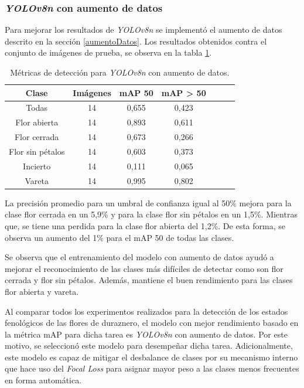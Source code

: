 \subsubsection{\textit{YOLOv8n} con aumento de datos}
\label{YOLOv8n con aumento de dato}

Para mejorar los resultados de \textit{YOLOv8n} se implementó el aumento de datos descrito en la sección \ref{aumentoDatos}. Los resultados obtenidos contra el conjunto de imágenes de prueba, se observa en la tabla \ref{tab:resultadosYoloConAug}.

\begin{table}[h]
	\centering
	\caption{Métricas de detección para \textit{YOLOv8n} con aumento de datos.}
	\begin{tabular}{c c c c c c c}    
		\toprule
		\textbf{Clase}&\textbf{Imágenes}&\textbf{mAP 50}&\textbf{mAP > 50}\\
		\midrule
		Todas & 14 & 0,655 & 0,423\\
		Flor abierta & 14 & 0,893 & 0,611 \\
		Flor cerrada & 14 & 0,673 & 0,266 \\
		Flor sin pétalos & 14 & 0,603 & 0,373 \\
		Incierto & 14 & 0,111 & 0,065 \\
		Vareta & 14 & 0,995 & 0,802 \\		
		\bottomrule
		\hline
	\end{tabular}
	\label{tab:resultadosYoloConAug}
\end{table}

La precisión promedio para un umbral de confianza igual al 50\% mejora para la clase flor cerrada en un 5,9\% y para la clase flor sin pétalos en un 1,5\%. Mientras que, se tiene una perdida para la clase flor abierta del 1,2\%. De esta forma, se observa un aumento del 1\% para el mAP 50 de todas las clases.

Se observa que el entrenamiento del modelo con aumento de datos ayudó a mejorar el reconocimiento de las clases más difíciles de detectar como son flor cerrada y flor sin pétalos. Además, mantiene el buen rendimiento para las clases flor abierta y vareta.

Al comparar todos los experimentos realizados para la detección de los estados fenológicos de las flores de duraznero, el modelo con mejor rendimiento basado en la métrica mAP para dicha tarea es \textit{YOLOv8n} con aumento de datos. Por este motivo, se seleccionó este modelo para desempeñar dicha tarea. Adicionalmente, este modelo es capaz de mitigar el desbalance de clases por su mecanismo interno que hace uso del \textit{Focal Loss} \cite{ARTICLE:15} para asignar mayor peso a las clases menos frecuentes en forma automática. 

